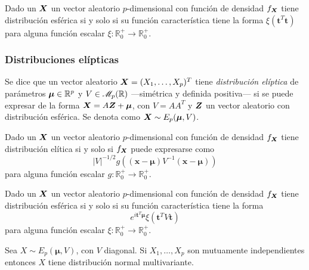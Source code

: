 \begin{nprop}
  Dado un $\boldsymbol{X}$ un vector aleatorio $p$-dimensional con función de densidad $f_{\boldsymbol{X}}$ tiene distribución esférica si y solo si su función característica tiene la forma $\xi(\boldsymbol t^T \boldsymbol t)$ para alguna función escalar $\xi: \mathbb R_0^+ \to \mathbb R_0^+$.
\end{nprop}

\subsubsection{Distribuciones elípticas}

\begin{ndef}
  Se dice que un vector aleatorio $\boldsymbol{X} = (X_1, \dots, X_p)^T$ tiene \textit{distribución elíptica} de parámetros $\boldsymbol \mu\in\mathbb{R}^p$ y $V\in\mathscr{M}_p(\mathbb{R})$ —simétrica y definida positiva— si se puede expresar de la forma $\boldsymbol{X} = A\boldsymbol{Z} + \boldsymbol \mu$, con $V = AA^T$ y $\boldsymbol{Z}$ un vector aleatorio con distribución esférica. Se denota como $\boldsymbol{X} \sim E_p(\boldsymbol \mu, V)$.
\end{ndef}

\begin{nprop}
  Dado un $\boldsymbol{X}$ un vector aleatorio $p$-dimensional con función de densidad $f_{\boldsymbol{X}}$ tiene distribución elítica si y solo si $f_{\boldsymbol{X}}$ puede expresarse como \[|V|^{-1/2}g\left((\boldsymbol x - \boldsymbol \mu)V^{-1}(\boldsymbol x - \boldsymbol \mu)\right)\] para alguna función escalar $g : \mathbb R_0^+ \to \mathbb R_0^+$.
\end{nprop}

\begin{nprop}
  Dado un $\boldsymbol{X}$ un vector aleatorio $p$-dimensional con función de densidad $f_{\boldsymbol{X}}$ tiene distribución esférica si y solo si su función característica tiene la forma \[e^{i \boldsymbol t^T \boldsymbol \mu}\xi(\boldsymbol t^T V \boldsymbol t)\] para alguna función escalar $\xi: \mathbb R_0^+ \to \mathbb R_0^+$.
\end{nprop}


\begin{nprop}
  Sea $X \sim E_p(\boldsymbol \mu, V)$, con $V$ diagonal. Si $X_1, \dots, X_p$ son mutuamente independientes entonces $X$ tiene distribución normal multivariante.
\end{nprop}

